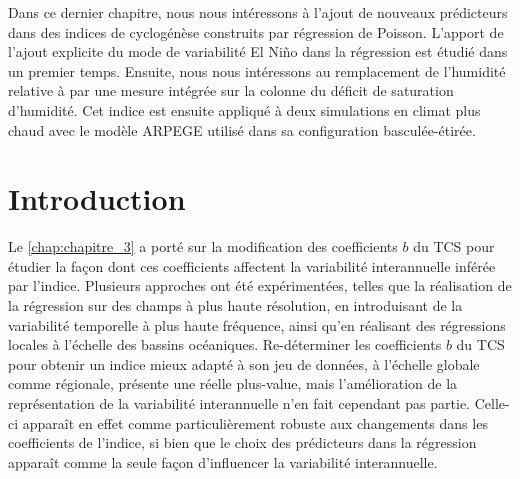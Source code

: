 \documentclass[../main.tex]{subfiles}
\begin{document}
\begin{itshape}
    Dans ce dernier chapitre, nous nous intéressons à l'ajout de nouveaux prédicteurs dans des indices de cyclogénèse construits par régression de Poisson.
    L'apport de l'ajout explicite du mode de variabilité El Niño dans la régression est étudié dans un premier temps. Ensuite, nous nous intéressons au
    remplacement de l'humidité relative à  par une mesure intégrée sur la colonne du déficit de saturation d'humidité. Cet indice est ensuite appliqué
    à deux simulations en climat plus chaud avec le modèle ARPEGE utilisé dans sa configuration basculée-étirée.
\end{itshape}

\minitoc
\newpage

\section{Introduction}

Le \cref{chap:chapitre_3} a porté sur la modification des coefficients $b$ du TCS pour étudier la façon dont ces coefficients affectent la variabilité
interannuelle inférée par l'indice. Plusieurs approches ont été expérimentées, telles que la réalisation de la régression sur des champs à plus haute
résolution, en introduisant de la variabilité temporelle à plus haute fréquence, ainsi qu'en réalisant des régressions locales à l'échelle des bassins
océaniques. Re-déterminer les coefficients $b$ du TCS pour obtenir un indice mieux adapté à son jeu de données, à l'échelle globale comme régionale, présente
une réelle plus-value, mais l'amélioration de la représentation de la variabilité interannuelle n'en fait cependant pas partie. Celle-ci apparaît en effet comme
particulièrement robuste aux changements dans les coefficients de l'indice, si bien que le choix des prédicteurs dans la régression apparaît comme la seule
façon d'influencer la variabilité interannuelle.
\end{document}
